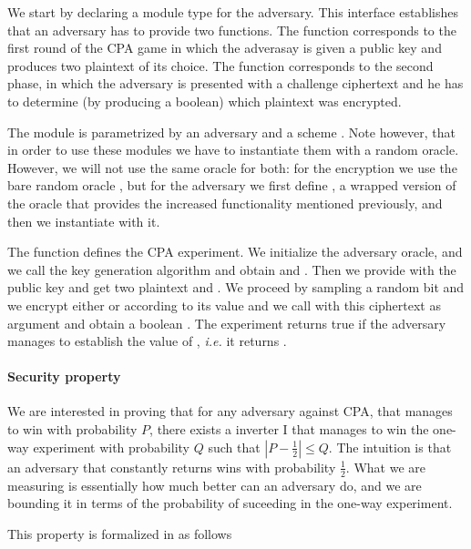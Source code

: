 
We start by declaring a module type for the adversary. This interface
establishes that an adversary has to provide two functions. The
function  corresponds to the first round of the CPA game in
which the adverasay is given a public key  and produces two
plaintext of its choice. The function  corresponds to the
second phase, in which the adversary is presented with a challenge
ciphertext  and he has to determine (by producing a boolean)
which plaintext was encrypted.

The module  is parametrized by an adversary  and a
scheme . Note however, that in order to use these modules we
have to instantiate them with a random oracle. However, we will not
use the same oracle for both: for the encryption we use the bare
random oracle , but for the adversary we first define ,
a wrapped version of the oracle that provides the increased
functionality mentioned previously, and then we instantiate 
with it.

The function  defines the CPA experiment. We initialize the
adversary oracle, and we call the key generation algorithm and obtain
 and . Then we provide  with the public key and get
two plaintext  and . We proceed by sampling a random bit
and we encrypt either  or  according to its value and we
call  with this ciphertext as argument and obtain a boolean
. The experiment returns true if the adversary manages to
establish the value of , {\em i.e.} it returns .

\paragraph{Security property}
We are interested in proving that for any adversary  against CPA,
that manages to win with probability $P$, there exists a inverter
I that manages to win the one-way experiment with probability $Q$ such
that $| P - \frac{1}{2} |\leq Q$. The intuition is that an adversary
that constantly returns  wins with probability
$\frac{1}{2}$. What we are measuring is essentially how much better
can an adversary do, and we are bounding it in terms of the
probability of suceeding in the one-way experiment.

This property is formalized in \EasyCrypt as follows



